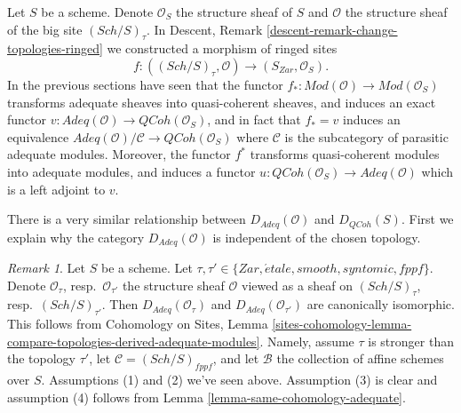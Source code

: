 \documentclass{stacks-project}
\theoremstyle{plain}
\theoremstyle{definition}
\theoremstyle{remark}
\newtheorem{remark}[subsection]{Remark}
\numberwithin{equation}{subsection}
\def\Sch{\mathit{Sch}}
\def\etale{{\acute{e}tale}}
\def\QCoh{\mathit{QCoh}}
\begin{document}
\noindent
Let $S$ be a scheme. Denote $\mathcal{O}_S$ the structure sheaf of $S$
and $\mathcal{O}$ the structure sheaf of the big site $(\Sch/S)_\tau$.
In
Descent, Remark \ref{descent-remark-change-topologies-ringed}
we constructed a morphism of ringed sites
\begin{equation}
\label{equation-compare-big-small}
f :
((\Sch/S)_\tau, \mathcal{O})
\longrightarrow
(S_{Zar}, \mathcal{O}_S).
\end{equation}
In the previous sections have seen that the functor
$f_* : \textit{Mod}(\mathcal{O}) \to \textit{Mod}(\mathcal{O}_S)$
transforms adequate sheaves into quasi-coherent sheaves, and
induces an exact functor
$v : \textit{Adeq}(\mathcal{O}) \to \QCoh(\mathcal{O}_S)$, and
in fact that $f_* = v$ induces an equivalence
$\textit{Adeq}(\mathcal{O})/\mathcal{C} \to \QCoh(\mathcal{O}_S)$
where $\mathcal{C}$ is the subcategory of parasitic adequate modules.
Moreover, the functor $f^*$ transforms quasi-coherent modules
into adequate modules, and induces a functor
$u : \QCoh(\mathcal{O}_S) \to \textit{Adeq}(\mathcal{O})$
which is a left adjoint to $v$.

\medskip\noindent
There is a very similar relationship between
$D_{\textit{Adeq}}(\mathcal{O})$ and $D_\QCoh(S)$.
First we explain why the category $D_{\textit{Adeq}}(\mathcal{O})$
is independent of the chosen topology.

\begin{remark}
\label{remark-D-adeq-independence-topology}
Let $S$ be a scheme.
Let $\tau, \tau' \in \{Zar, \etale, smooth, syntomic, fppf\}$.
Denote $\mathcal{O}_\tau$, resp.\ $\mathcal{O}_{\tau'}$
the structure sheaf $\mathcal{O}$ viewed as a sheaf on
$(\Sch/S)_\tau$, resp.\ $(\Sch/S)_{\tau'}$.
Then $D_{\textit{Adeq}}(\mathcal{O}_\tau)$ and
$D_{\textit{Adeq}}(\mathcal{O}_{\tau'})$ are canonically isomorphic.
This follows from Cohomology on Sites, Lemma
\ref{sites-cohomology-lemma-compare-topologies-derived-adequate-modules}.
Namely, assume $\tau$ is stronger than the topology $\tau'$, let
$\mathcal{C} = (\Sch/S)_{fppf}$, and let $\mathcal{B}$ the collection
of affine schemes over $S$. Assumptions (1) and (2) we've seen above.
Assumption (3) is clear and assumption (4) follows from
Lemma \ref{lemma-same-cohomology-adequate}.
\end{remark}
\end{document}
